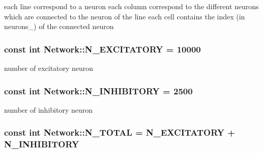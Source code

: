 each line correspond to a neuron each column correspond to the different neurons which are connected to the neuron of the line each cell contains the index (in neurons\-\_\-) of the connected neuron \hypertarget{classNetwork_afdc85e896d66ebb7c03e5f084fe112f4}{
\subsubsection[{N\-\_\-\-E\-X\-C\-I\-T\-A\-T\-O\-R\-Y}]{\setlength{\rightskip}{0pt plus 5cm}const int Network\-::\-N\-\_\-\-E\-X\-C\-I\-T\-A\-T\-O\-R\-Y = 10000\hspace{0.3cm}{\ttfamily [private]}}}\label{classNetwork_afdc85e896d66ebb7c03e5f084fe112f4}


number of excitatory neuron 

\hypertarget{classNetwork_a9194d47c3f0524982ed4be54c5dec78e}{
\subsubsection[{N\-\_\-\-I\-N\-H\-I\-B\-I\-T\-O\-R\-Y}]{\setlength{\rightskip}{0pt plus 5cm}const int Network\-::\-N\-\_\-\-I\-N\-H\-I\-B\-I\-T\-O\-R\-Y = 2500\hspace{0.3cm}{\ttfamily [private]}}}\label{classNetwork_a9194d47c3f0524982ed4be54c5dec78e}


number of inhibitory neuron 

\hypertarget{classNetwork_a0886932ffef920b0691f563eb9eeb92c}{
\subsubsection[{N\-\_\-\-T\-O\-T\-A\-L}]{\setlength{\rightskip}{0pt plus 5cm}const int Network\-::\-N\-\_\-\-T\-O\-T\-A\-L = {\bf N\-\_\-\-E\-X\-C\-I\-T\-A\-T\-O\-R\-Y} + {\bf N\-\_\-\-I\-N\-H\-I\-B\-I\-T\-O\-R\-Y}\hspace{0.3cm}{\ttfamily [private]}}}\label{classNetwork_a0886932ffef920b0691f563eb9eeb92c}


